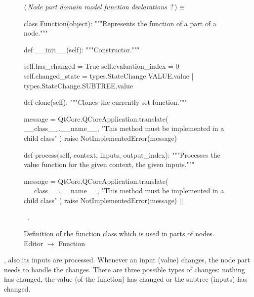 \documentclass[%
    a4paper,    %
    justified,  %
    nobib,      %
    openany     %
]{tufte-book}
\makeatletter
\renewcommand{\label}[1]{\@tufte@label{##1}}%
\makeatother
\begin{document}
\begin{figure}
\begin{flushleft} \small
\begin{minipage}{\linewidth}\label{scrap117}\raggedright\small
{} $\langle\,${\itshape Node part domain model function declarations}\nobreak\ {\footnotesize {?}}$\,\rangle\equiv$
\vspace{-1ex}
\begin{pythoncode}
class Function(object):
    """Represents the function of a part of a node."""

    def __init__(self):
        """Constructor."""

        self.has_changed = True
        self.evaluation_index = 0
        self.changed_state = types.StateChange.VALUE.value | types.StateChange.SUBTREE.value

    def clone(self):
        """Clones the currently set function."""

        message = QtCore.QCoreApplication.translate(
            __class__.__name__,
            "This method must be implemented in a child class"
        )
        raise NotImplementedError(message)

    def process(self, context, inputs, output_index):
        """Processes the value function for the given context, the given
        inputs."""

        message = QtCore.QCoreApplication.translate(
            __class__.__name__,
            "This method must be implemented in a child class"
        )
        raise NotImplementedError(message)
|\NWsep|
\end{pythoncode}
\vspace{1.5ex}
\footnotesize
\begin{list}{}{\setlength{\itemsep}{-\parsep}\setlength{\itemindent}{-\leftmargin}}
\item \NWtxtMacroRefIn\ .

\item{}
\end{list}
\end{minipage}\vspace{4ex}
\end{flushleft}
\caption{Definition of the function class which is used in parts of nodes.
  \newline{}\newline{}Editor $\rightarrow$ Function}
\label{editor:lst:function}
\end{figure}

, also its inputs are
processed. Whenever an input (value) changes, the node part needs to handle the
changes. There are three possible types of changes: nothing has changed, the
value (of the function) has changed or the subtree (inputs) has changed.
\end{document}
